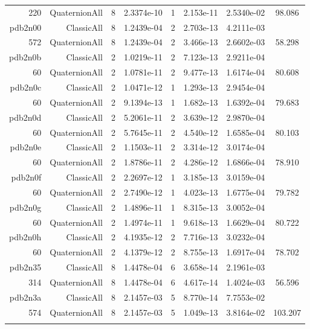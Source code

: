 \begin{xltabular}{\textwidth}{r|rcS[table-format=1.4e+2]cS[table-format=1.3e+2]S[table-format=1.4e+2]S[table-format=-1.3]}
220 & QuaternionAll & 8 & 2.3374e-10 & 1 & 2.153e-11 & 2.5340e-02 & 98.086\\  \addlinespace
pdb2n00 & ClassicAll & 8 & 1.2439e-04 & 2 & 2.703e-13 & 4.2111e-03 & \\
572 & QuaternionAll & 8 & 1.2439e-04 & 2 & 3.466e-13 & 2.6602e-03 & 58.298\\  \addlinespace
pdb2n0b & ClassicAll & 2 & 1.0219e-11 & 2 & 7.123e-13 & 2.9211e-04 & \\
60 & QuaternionAll & 2 & 1.0781e-11 & 2 & 9.477e-13 & 1.6174e-04 & 80.608\\  \addlinespace
pdb2n0c & ClassicAll & 2 & 1.0471e-12 & 1 & 1.293e-13 & 2.9454e-04 & \\
60 & QuaternionAll & 2 & 9.1394e-13 & 1 & 1.682e-13 & 1.6392e-04 & 79.683\\  \addlinespace
pdb2n0d & ClassicAll & 2 & 5.2061e-11 & 2 & 3.639e-12 & 2.9870e-04 & \\
60 & QuaternionAll & 2 & 5.7645e-11 & 2 & 4.540e-12 & 1.6585e-04 & 80.103\\  \addlinespace
pdb2n0e & ClassicAll & 2 & 1.1503e-11 & 2 & 3.314e-12 & 3.0174e-04 & \\
60 & QuaternionAll & 2 & 1.8786e-11 & 2 & 4.286e-12 & 1.6866e-04 & 78.910\\  \addlinespace
pdb2n0f & ClassicAll & 2 & 2.2697e-12 & 1 & 3.185e-13 & 3.0159e-04 & \\
60 & QuaternionAll & 2 & 2.7490e-12 & 1 & 4.023e-13 & 1.6775e-04 & 79.782\\  \addlinespace
pdb2n0g & ClassicAll & 2 & 1.4896e-11 & 1 & 8.315e-13 & 3.0052e-04 & \\
60 & QuaternionAll & 2 & 1.4974e-11 & 1 & 9.618e-13 & 1.6629e-04 & 80.722\\  \addlinespace
pdb2n0h & ClassicAll & 2 & 4.1935e-12 & 2 & 7.716e-13 & 3.0232e-04 & \\
60 & QuaternionAll & 2 & 4.1379e-12 & 2 & 8.755e-13 & 1.6917e-04 & 78.702\\  \addlinespace
pdb2n35 & ClassicAll & 8 & 1.4478e-04 & 6 & 3.658e-14 & 2.1961e-03 & \\
314 & QuaternionAll & 8 & 1.4478e-04 & 6 & 4.617e-14 & 1.4024e-03 & 56.596\\  \addlinespace
pdb2n3a & ClassicAll & 8 & 2.1457e-03 & 5 & 8.770e-14 & 7.7553e-02 & \\
574 & QuaternionAll & 8 & 2.1457e-03 & 5 & 1.049e-13 & 3.8164e-02 & 103.207\\  \addlinespace

\end{xltabular}

